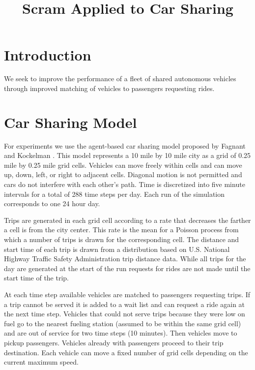 \documentclass[letterpaper]{article}
\begin{document}
%
\title{Scram Applied to Car Sharing}
\author{}
\maketitle
\begin{abstract}
\begin{quote}

\end{quote}
\end{abstract}

\noindent 

\section{Introduction}
We seek to improve the performance of a fleet of shared autonomous vehicles through improved matching of vehicles to passengers requesting rides. 

\section{Car Sharing Model}

For experiments we use the agent-based car sharing model proposed by Fagnant and Kockelman \cite{fagnant2014travel}. This model represents a 10 mile by 10 mile city as a grid of 0.25 mile by 0.25 mile grid cells. Vehicles can move freely within cells and can move up, down, left, or right to adjacent cells. Diagonal motion is not permitted and cars do not interfere with each other's path. Time is discretized into five minute intervals for a total of 288 time steps per day. Each run of the simulation corresponds to one 24 hour day.

Trips are generated in each grid cell according to a rate that decreases the farther a cell is from the city center. This rate is the mean for a Poisson process from which a number of trips is drawn for the corresponding cell. The distance and start time of each trip is drawn from a distribution based on U.S. National Highway Traffic Safety Administration trip distance data. While all trips for the day are generated at the start of the run requests for rides are not made until the start time of the trip. 

At each time step available vehicles are matched to passengers requesting trips. If a trip cannot be served it is added to a wait list and can request a ride again at the next time step. Vehicles that could not serve trips because they were low on fuel go to the nearest fueling station (assumed to be within the same grid cell) and are out of service for two time steps (10 minutes). Then vehicles move to pickup passengers. Vehicles already with passengers proceed to their trip destination. Each vehicle can move a fixed number of grid cells depending on the current maximum speed.
\end{document}
